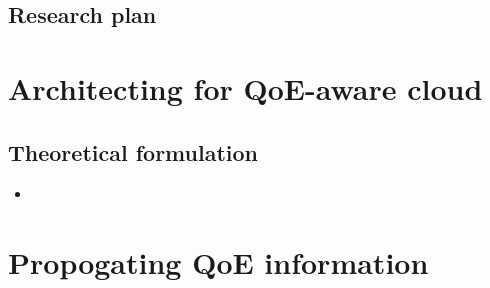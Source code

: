 \documentclass{proposalnsf}
\begin{document}
\subsection{Research plan}

\newpage
\section{Architecting for QoE-aware cloud}

\subsection{Theoretical formulation}

\begin{itemize}
\item 
\end{itemize}

\newpage
\section{Propogating QoE information}




%
%
%
%
%
%
%
%
%
%
%
%
%

\newpage
{}
\renewcommand{\thepage} {E--\arabic{page}}
%


\newpage
{}
\renewcommand{\thepage} {F--\arabic{page}}
%

%
%
%
%
%
%

\end{document}
